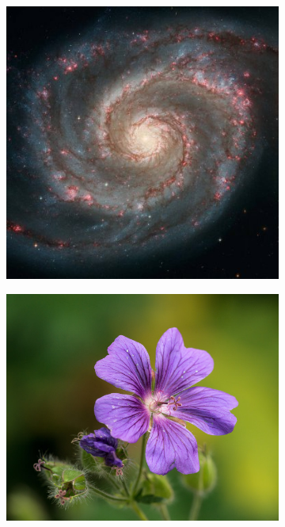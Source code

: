 \documentclass[12pt]{article}
\begin{document}
\blindtext


\begin{figure}[ht]
    \begin{subfigure}{0.4\textwidth}
        \centering
        \includegraphics[width=\textwidth]{img/universe.jpg}
    \end{subfigure}
    \hfill
    \begin{subfigure}{0.4\textwidth}
        \centering
        \includegraphics[width=\textwidth]{img/ganajp-purple-flower.jpg}
    \end{subfigure}
\end{figure}


\blindtext
\end{document}
